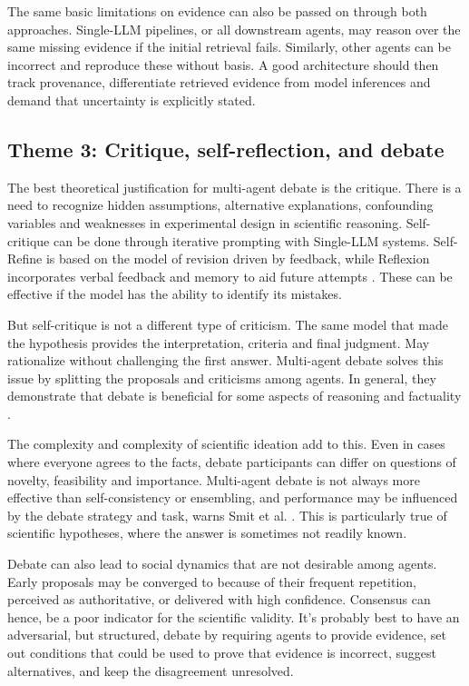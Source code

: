 \documentclass[acmsmall,screen,review]{acmart}
\begin{document}
The same basic limitations on evidence can also be passed on through both approaches. Single-LLM pipelines, or all downstream agents, may reason over the same missing evidence if the initial retrieval fails. Similarly, other agents can be incorrect and reproduce these without basis. A good architecture should then track provenance, differentiate retrieved evidence from model inferences and demand that uncertainty is explicitly stated.


\subsection{Theme 3: Critique, self-reflection, and debate}
\label{subsec:critique-debate}
The best theoretical justification for multi-agent debate is the critique. There is a need to recognize hidden assumptions, alternative explanations, confounding variables and weaknesses in experimental design in scientific reasoning. Self-critique can be done through iterative prompting with Single-LLM systems. Self-Refine is based on the model of revision \cite{madaan2023selfrefine} driven by feedback, while Reflexion incorporates verbal feedback and memory to aid future attempts \cite{shinn2023reflexion}. These can be effective if the model has the ability to identify its mistakes.

But self-critique is not a different type of criticism. The same model that made the hypothesis provides the interpretation, criteria and final judgment. May rationalize without challenging the first answer. Multi-agent debate solves this issue by splitting the proposals and criticisms among agents. In general, they demonstrate that debate is beneficial for some aspects of reasoning and factuality \cite{du2024improving}.

The complexity and complexity of scientific ideation add to this. Even in cases where everyone agrees to the facts, debate participants can differ on questions of novelty, feasibility and importance. Multi-agent debate is not always more effective than self-consistency or ensembling, and performance may be influenced by the debate strategy and task, warns Smit et al. \cite{smit2024mad}. This is particularly true of scientific hypotheses, where the answer is sometimes not readily known.

Debate can also lead to social dynamics that are not desirable among agents. Early proposals may be converged to because of their frequent repetition, perceived as authoritative, or delivered with high confidence. Consensus can hence, be a poor indicator for the scientific validity. It's probably best to have an adversarial, but structured, debate by requiring agents to provide evidence, set out conditions that could be used to prove that evidence is incorrect, suggest alternatives, and keep the disagreement unresolved.
\end{document}
